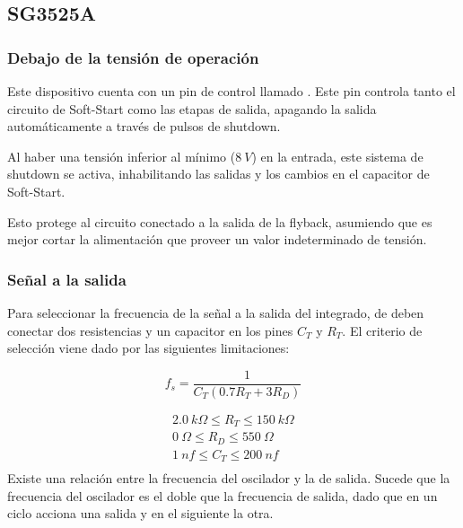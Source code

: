 %
%
%

\subsection{SG3525A}

\subsubsection{Debajo de la tensión de operación}

Este dispositivo cuenta con un pin de control llamado . Este pin controla tanto el circuito de Soft-Start como las etapas de salida, apagando la salida automáticamente a través de pulsos de shutdown.

Al haber una tensión inferior al mínimo ($8 \ V$) en la entrada, este sistema de shutdown se activa, inhabilitando las salidas y los cambios en el capacitor de Soft-Start.

Esto protege al circuito conectado a la salida de la flyback, asumiendo que es mejor cortar la alimentación que proveer un valor indeterminado de tensión.

\subsubsection{Señal a la salida}

Para seleccionar la frecuencia de la señal a la salida del integrado, de deben conectar dos resistencias y un capacitor en los pines $C_T$ y $R_T$. El criterio de selección viene dado por las siguientes limitaciones:

\begin{equation}
	f_s = \frac{1}{C_T \left( 0.7 R_T + 3 R_D \right)}
\end{equation}

\begin{equation*}
\begin{gathered}
2.0 \ k\Omega \leqslant R_T \leqslant 150 \ k\Omega \\
0 \ \Omega \leqslant R_D \leqslant 550 \ \Omega \\
1 \ nf \leqslant C_T \leqslant 200 \ nf \\
\end{gathered}
\end{equation*}
Existe una relación entre la frecuencia del oscilador y la de salida.
 Sucede que la frecuencia del oscilador es el doble que la frecuencia de salida, dado que en un ciclo acciona una salida y en el siguiente la otra.\\

